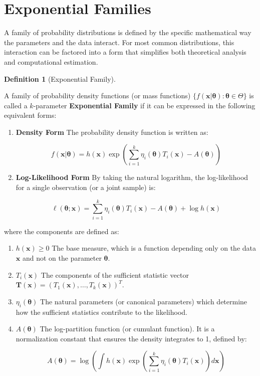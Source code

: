 \documentclass[
  letterpaper,
  DIV=11,
  numbers=noendperiod]{scrreprt}
\renewcommand{\[}{\begin{equation}}
\renewcommand{\]}{\end{equation}}
\theoremstyle{definition}
\newtheorem{definition}{Definition}[chapter]
\theoremstyle{plain}
\theoremstyle{plain}
\theoremstyle{plain}
\theoremstyle{definition}
\theoremstyle{plain}
\theoremstyle{remark}
\begin{document}
\section{Exponential Families}\label{exponential-families}

A family of probability distributions is defined by the specific
mathematical way the parameters and the data interact. For most common
distributions, this interaction can be factored into a form that
simplifies both theoretical analysis and computational estimation.

\begin{definition}[Exponential
Family]\protect\hypertarget{def-exponential-family}{}\label{def-exponential-family}

A family of probability density functions (or mass functions)
\(\{f(\mathbf{x}|\boldsymbol{\theta}) : \boldsymbol{\theta} \in \Theta\}\)
is called a \(k\)-parameter \textbf{Exponential Family} if it can be
expressed in the following equivalent forms:

\begin{enumerate}
\def\labelenumi{\arabic{enumi}.}
\item
  \textbf{Density Form} The probability density function is written as:

  \[
  f(\mathbf{x}|\boldsymbol{\theta}) = h(\mathbf{x}) \exp \left( \sum_{i=1}^k \eta_i(\boldsymbol{\theta}) T_i(\mathbf{x}) - A(\boldsymbol{\theta}) \right)
  \]
\item
  \textbf{Log-Likelihood Form} By taking the natural logarithm, the
  log-likelihood for a single observation (or a joint sample) is:

  \[
  \ell(\boldsymbol{\theta}; \mathbf{x}) = \sum_{i=1}^k \eta_i(\boldsymbol{\theta}) T_i(\mathbf{x}) - A(\boldsymbol{\theta}) + \log h(\mathbf{x})
  \]
\end{enumerate}

where the components are defined as:

\begin{enumerate}
\def\labelenumi{\arabic{enumi}.}
\item
  \textbf{\(h(\mathbf{x}) \ge 0\)} The base measure, which is a function
  depending only on the data \(\mathbf{x}\) and not on the parameter
  \(\boldsymbol{\theta}\).
\item
  \textbf{\(T_i(\mathbf{x})\)} The components of the sufficient
  statistic vector
  \(\mathbf{T}(\mathbf{x}) = (T_1(\mathbf{x}), \dots, T_k(\mathbf{x}))^T\).
\item
  \textbf{\(\eta_i(\boldsymbol{\theta})\)} The natural parameters (or
  canonical parameters) which determine how the sufficient statistics
  contribute to the likelihood.
\item
  \textbf{\(A(\boldsymbol{\theta})\)} The log-partition function (or
  cumulant function). It is a normalization constant that ensures the
  density integrates to 1, defined by:

  \[
  A(\boldsymbol{\theta}) = \log \left( \int h(\mathbf{x}) \exp \left( \sum_{i=1}^k \eta_i(\boldsymbol{\theta}) T_i(\mathbf{x}) \right) d\mathbf{x} \right)
  \]
\end{enumerate}

\end{definition}
\end{document}
